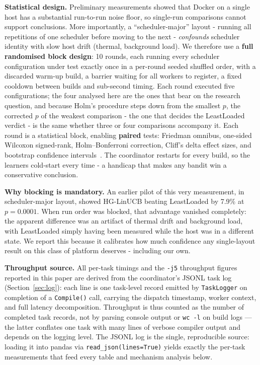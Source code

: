 \documentclass[final,5p,times,twocolumn]{elsarticle}
\begin{document}
\textbf{Statistical design.} Preliminary measurements showed that Docker on a single host has a substantial run-to-run noise floor, so single-run comparisons cannot support conclusions. More importantly, a ``scheduler-major'' layout - running all repetitions of one scheduler before moving to the next - \emph{confounds} scheduler identity with slow host drift (thermal, background load). We therefore use a \textbf{full randomised block design}: 10 rounds, each running every scheduler configuration under test exactly once in a per-round seeded shuffled order, with a discarded warm-up build, a barrier waiting for all workers to register, a fixed cooldown between builds and sub-second timing. Each round executed five configurations; the four analysed here are the ones that bear on the research question, and because Holm's procedure steps down from the smallest $p$, the corrected $p$ of the weakest comparison - the one that decides the LeastLoaded verdict - is the same whether three or four comparisons accompany it. Each round is a statistical block, enabling \textbf{paired} tests: Friedman omnibus, one-sided Wilcoxon signed-rank, Holm--Bonferroni correction, Cliff's delta effect sizes, and bootstrap confidence intervals~\cite{wilcoxon1945,holm1979,friedman1937,cliff1993}. The coordinator restarts for every build, so the learners cold-start every time - a handicap that makes any bandit win a conservative conclusion.

\textbf{Why blocking is mandatory.} An earlier pilot of this very measurement, in scheduler-major layout, showed HG-LinUCB beating LeastLoaded by 7.9\% at $p=0.0001$. When run order was blocked, that advantage vanished completely: the apparent difference was an artifact of thermal drift and background load, with LeastLoaded simply having been measured while the host was in a different state. We report this because it calibrates how much confidence any single-layout result on this class of platform deserves - including our own.

\textbf{Throughput source.} All per-task timings and the \texttt{-j5} throughput figures reported in this paper are derived from the coordinator's JSONL task log (Section~\ref{sec:log}): each line is one task-level record emitted by \texttt{TaskLogger} on completion of a \texttt{Compile()} call, carrying the dispatch timestamp, worker context, and full latency decomposition. Throughput is thus counted as the number of completed task records, not by parsing console output or \texttt{wc -l} on build logs --- the latter conflates one task with many lines of verbose compiler output and depends on the logging level. The JSONL log is the single, reproducible source: loading it into pandas via \texttt{read\_json(lines=True)} yields exactly the per-task measurements that feed every table and mechanism analysis below.
\end{document}
